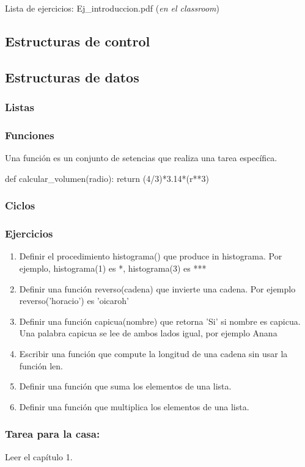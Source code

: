 \begin{frame}
    \vspace{15mm}
    Lista de ejercicios: Ej_introduccion.pdf (\emph{en el classroom})
\end{frame}


\subsection{Estructuras de control}


\subsection{Estructuras de datos}


\begin{frame}
    \frametitle{Listas}
\end{frame}


\begin{frame}[fragile]
    \frametitle{Funciones}
    Una funci\'on es un conjunto de setencias que realiza una tarea espec\'ifica.
    \begin{python}
        def calcular_volumen(radio):
            return (4/3)*3.14*(r**3)
    \end{python}
\end{frame}

\begin{frame}
    \frametitle{Ciclos}
\end{frame}


\begin{frame}
    \frametitle{Ejercicios}
    \begin{enumerate}
        \item Definir el procedimiento histograma() que produce in histograma. Por ejemplo, histograma(1) es *, histograma(3) es ***
        \item Definir una funci\'on reverso(cadena) que invierte una cadena. Por ejemplo reverso('horacio') es 'oicaroh'
        \item Definir una funci\'on capicua(nombre) que retorna 'Si' si nombre es capicua. Una palabra capicua se lee de ambos lados igual, por ejemplo Anana
        \item Escribir una funci\'on que compute la longitud de una cadena sin usar la funci\'on len.
        \item Definir una funci\'on que suma los elementos de una lista.
        \item Definir una funci\'on que multiplica los elementos de una lista.
    \end{enumerate}
\end{frame}

\begin{frame}
    \frametitle{Tarea para la casa:}
    Leer el cap\'itulo 1.
\end{frame}
